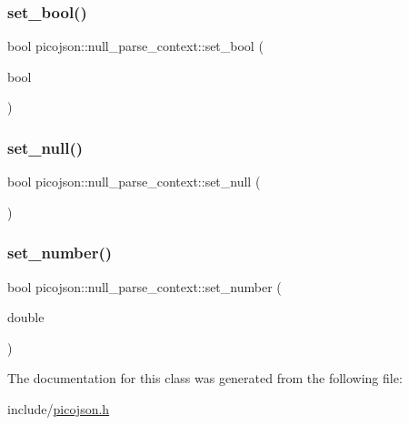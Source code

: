 \subsubsection{\texorpdfstring{set\+\_\+bool()}{set\_bool()}}
{\footnotesize\ttfamily bool picojson\+::null\+\_\+parse\+\_\+context\+::set\+\_\+bool (\begin{DoxyParamCaption}\item[{bool}]{ }\end{DoxyParamCaption})\hspace{0.3cm}{\ttfamily [inline]}}

\hypertarget{classpicojson_1_1null__parse__context_ad142ddadd513e41324f8d0515a19df2c}{}\label{classpicojson_1_1null__parse__context_ad142ddadd513e41324f8d0515a19df2c} 
\subsubsection{\texorpdfstring{set\+\_\+null()}{set\_null()}}
{\footnotesize\ttfamily bool picojson\+::null\+\_\+parse\+\_\+context\+::set\+\_\+null (\begin{DoxyParamCaption}{ }\end{DoxyParamCaption})\hspace{0.3cm}{\ttfamily [inline]}}

\hypertarget{classpicojson_1_1null__parse__context_aeb8326108d42615b1b04cf82d510040c}{}\label{classpicojson_1_1null__parse__context_aeb8326108d42615b1b04cf82d510040c} 
\subsubsection{\texorpdfstring{set\+\_\+number()}{set\_number()}}
{\footnotesize\ttfamily bool picojson\+::null\+\_\+parse\+\_\+context\+::set\+\_\+number (\begin{DoxyParamCaption}\item[{double}]{ }\end{DoxyParamCaption})\hspace{0.3cm}{\ttfamily [inline]}}



The documentation for this class was generated from the following file\+:\begin{DoxyCompactItemize}
\item 
include/\hyperlink{picojson_8h}{picojson.\+h}\end{DoxyCompactItemize}
